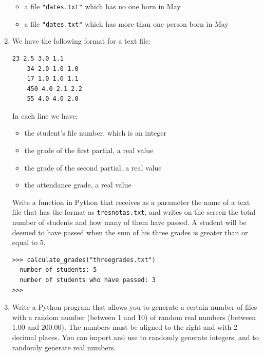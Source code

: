 \documentclass[
  fontsize=10pt,
  a4paper,
]{scrartcl}
\begin{document}
\begin{enumerate}
\begin{itemize}
    \item a file \verb|"dates.txt"| which has no one born in May
    \item a file \verb|"dates.txt"| which has more than one person born in May
\end{itemize}


\item We have the following format for a text file:\\

\begin{Verbatim}[frame=single, label={\em threegrades.txt}]
    23 2.5 3.0 1.1
    34 2.0 1.0 1.0
    17 1.0 1.0 1.1
    450 4.0 2.1 2.2
    55 4.0 4.0 2.0
\end{Verbatim}

In each line we have:
\begin{itemize}
    \item the student's file number, which is an integer
    \item the grade of the first partial, a real value
    \item the grade of the second partial, a real value
    \item the attendance grade, a real value
\end{itemize}



Write a function  in Python that receives as a parameter the name of a text file that has the format as \verb|tresnotas.txt|, and writes on the screen the total number of students and how many of them have passed. A student will be deemed to have passed when the sum of his three grades is greater than or equal to 5.\\

\begin{Verbatim}[frame=single, label={\em example of calling the function calculate\_grades}]
>>> calculate_grades("threegrades.txt")
  number of students: 5
  number of students who have passed: 3
>>> 
\end{Verbatim}


\item \label{generate_files}
Write a Python program that allows you to generate a certain number of files with a random number (between 1 and 10) of random real numbers (between 1.00 and 200.00). The numbers must be aligned to the right and with 2 decimal places. You can import  and use  to randomly generate integers, and  to randomly generate real numbers.


\end{enumerate}
\end{document}
